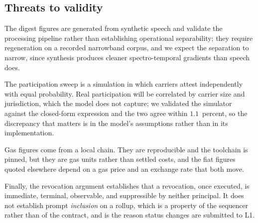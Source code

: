 \subsection{Threats to validity}

The digest figures are generated from synthetic speech and validate the
processing pipeline rather than establishing operational separability; they
require regeneration on a recorded narrowband corpus, and we expect the
separation to narrow, since synthesis produces cleaner spectro-temporal
gradients than speech does.

The participation sweep is a simulation in which carriers attest independently
with equal probability. Real participation will be correlated by carrier size
and jurisdiction, which the model does not capture; we validated the simulator
against the closed-form expression and the two agree within $1.1$~percent, so
the discrepancy that matters is in the model's assumptions rather than in its
implementation.

Gas figures come from a local chain. They are reproducible and the toolchain is
pinned, but they are gas units rather than settled costs, and the fiat figures
quoted elsewhere depend on a gas price and an exchange rate that both move.

Finally, the revocation argument establishes that a revocation, once executed,
is immediate, terminal, observable, and suppressible by neither principal. It
does not establish prompt \emph{inclusion} on a rollup, which is a property of
the sequencer rather than of the contract, and is the reason status changes are
submitted to L1.
